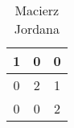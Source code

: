\begin{table}[h]
\centering
\begin{tabular}{|c|c|c|} 
\hline
1 & 0 & 0 \\ \hline
0 & 2 & 1 \\ \hline
0 & 0 & 2 \\ \hline
\end{tabular}
\label{tab:Jordan}
\caption{Macierz Jordana}
\end{table}